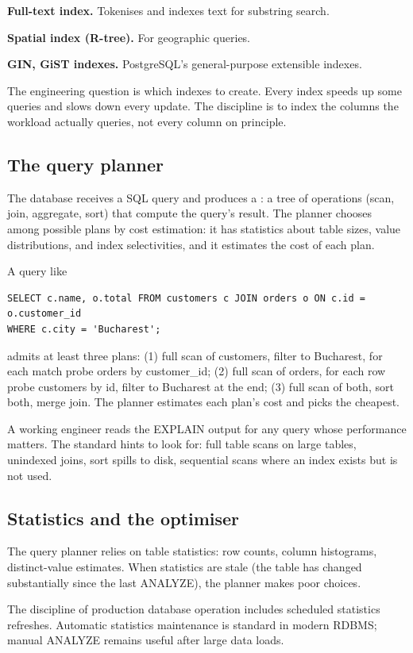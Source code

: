 \textbf{Full-text index.} Tokenises and indexes text for substring search.

\textbf{Spatial index (R-tree).} For geographic queries.

\textbf{GIN, GiST indexes.} PostgreSQL's general-purpose extensible indexes.

The engineering question is which indexes to create. Every index speeds up some queries and slows down every update. The discipline is to index the columns the workload actually queries, not every column on principle.

\subsection{The query planner}

The database receives a SQL query and produces a : a tree of operations (scan, join, aggregate, sort) that compute the query's result. The planner chooses among possible plans by cost estimation: it has statistics about table sizes, value distributions, and index selectivities, and it estimates the cost of each plan.

A query like
\begin{verbatim}
SELECT c.name, o.total FROM customers c JOIN orders o ON c.id = o.customer_id
WHERE c.city = 'Bucharest';
\end{verbatim}
admits at least three plans: (1) full scan of customers, filter to Bucharest, for each match probe orders by customer\_id; (2) full scan of orders, for each row probe customers by id, filter to Bucharest at the end; (3) full scan of both, sort both, merge join. The planner estimates each plan's cost and picks the cheapest.

A working engineer reads the EXPLAIN output for any query whose performance matters. The standard hints to look for: full table scans on large tables, unindexed joins, sort spills to disk, sequential scans where an index exists but is not used.

\subsection{Statistics and the optimiser}

The query planner relies on table statistics: row counts, column histograms, distinct-value estimates. When statistics are stale (the table has changed substantially since the last ANALYZE), the planner makes poor choices.

The discipline of production database operation includes scheduled statistics refreshes. Automatic statistics maintenance is standard in modern RDBMS; manual ANALYZE remains useful after large data loads.

